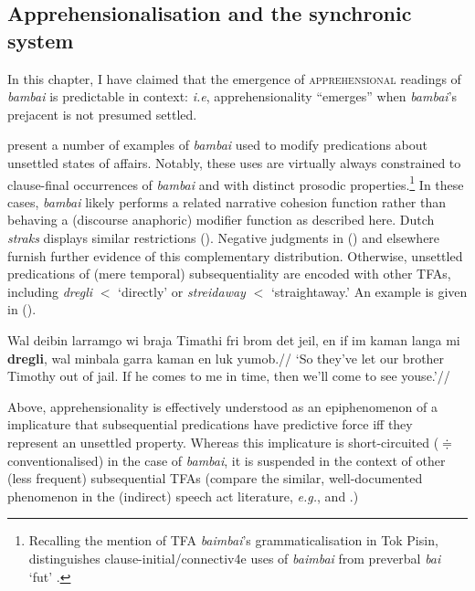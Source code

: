 \subsection{Apprehensionalisation and the synchronic system}\label{subseq-sync}

In this chapter, I have claimed that the emergence of \textsc{apprehensional} readings of \textit{bambai} is predictable in context: \textit{i.e}, apprehensionality ``emerges'' when \textit{bambai}'s prejacent is not presumed settled.

\citet{Angelo2016} present a number of examples of \textit{bambai} used to modify predications about unsettled states of affairs. Notably, these uses are virtually always constrained to clause-final occurrences of \textit{bambai} and with distinct prosodic properties.\footnote{Recalling the mention of TFA \textit{baimbai}'s grammaticalisation in Tok Pisin, \citet{Romaine1995} distinguishes clause-initial/connectiv4e uses of \textit{baimbai} from preverbal \textit{bai} `\gls{fut}'
\citep[see also][271]{Bybee1994}.} In these cases, \textit{bambai} likely performs a related narrative cohesion function rather than behaving a (discourse anaphoric) modifier function as described here. Dutch \textit{straks} displays similar restrictions (). Negative judgments in () and elsewhere furnish further evidence of this complementary distribution. Otherwise, unsettled predications of (mere temporal) subsequentiality are encoded with other TFAs, including \textit{dregli} $ < $ `directly' or \textit{streidaway} $ < $ `straightaway.' An example is given in (\nextx).

\pex\begingl\gla  Wal deibin larramgo wi braja Timathi fri brom det jeil, en if im kaman langa mi \textbf{dregli}, wal minbala garra kaman en luk yumob.//
\glft `So they've let our brother Timothy out of jail. If he comes to me in time, then we'll come to see youse.'\trailingcitation{[KB~Hibrus 13:20]}//\endgl
\xe

Above, apprehensionality is effectively understood as an epiphenomenon of a implicature that subsequential predications have predictive force iff they represent an unsettled property. Whereas this implicature is short-circuited ($ \doteqdot $ conventionalised) in the case of \textit{bambai}, it is suspended in the context of other (less frequent) subsequential TFAs (compare the similar, well-documented phenomenon in the (indirect) speech act literature, \textit{e.g.}, \citealt[29-31]{Horn1984} and \citealt{Morgan1978}.)


